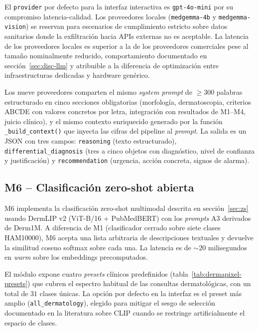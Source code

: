 El \texttt{provider} por defecto para la interfaz interactiva es
\texttt{gpt-4o-mini} por su compromiso latencia-calidad. Los
proveedores locales (\texttt{medgemma-4b} y
\texttt{medgemma-vision}) se reservan para escenarios de
cumplimiento estricto sobre datos sanitarios donde la
exfiltración hacia APIs externas no es aceptable. La latencia de
los proveedores locales es superior a la de los proveedores
comerciales pese al tamaño nominalmente reducido, comportamiento
documentado en sección~\ref{sec:disc-llm} y atribuible a la diferencia
de optimización entre infraestructuras dedicadas y hardware
genérico.

Los nueve proveedores comparten el mismo \emph{system prompt} de
$\geq 300$ palabras estructurado en cinco secciones obligatorias
(morfología, dermatoscopia, criterios ABCDE con valores concretos
por letra, integración con resultados de M1--M4, juicio clínico),
y el mismo contexto enriquecido generado por la función
\texttt{\_build\_context()} que inyecta las cifras del pipeline al
\emph{prompt}. La salida es un JSON con tres campos:
\texttt{reasoning} (texto estructurado), \texttt{differential\_diagnosis}
(tres a cinco objetos con diagnóstico, nivel de confianza y
justificación) y \texttt{recommendation} (urgencia, acción
concreta, signos de alarma).

\subsection{M6 -- Clasificación zero-shot abierta}
\label{sec:dermapixel-m6}

M6 implementa la clasificación zero-shot multimodal descrita en
sección~\ref{sec:zs} usando DermLIP v2 (ViT-B/16 + PubMedBERT) con los
\emph{prompts} A3 derivados de Derm1M. A diferencia de M1
(clasificador cerrado sobre siete clases HAM10000), M6 acepta una
lista arbitraria de descripciones textuales y devuelve la similitud
coseno softmax sobre cada una. La latencia es de
$\sim 20$ milisegundos en \emph{warm} sobre los embeddings
precomputados.

El módulo expone cuatro \emph{presets} clínicos predefinidos
(tabla~\ref{tab:dermapixel-presets}) que cubren el espectro habitual
de las consultas dermatológicas, con un total de $31$ clases
únicas. La opción por defecto en la interfaz es el preset más
amplio (\texttt{all\_dermatology}), elegido para mitigar el sesgo
de selección documentado en la literatura sobre CLIP cuando se
restringe artificialmente el espacio de clases.

